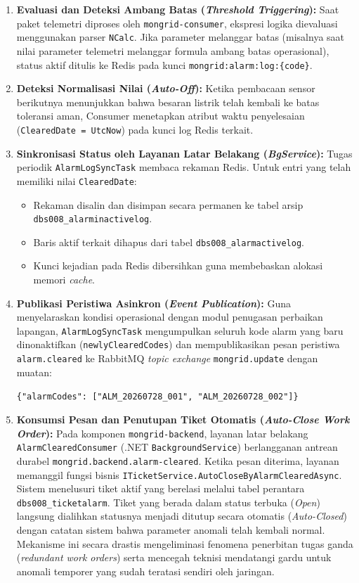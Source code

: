 \begin{enumerate}[label=\arabic*., leftmargin=*, itemsep=0pt]
  \item \textbf{Evaluasi dan Deteksi Ambang Batas (\textit{Threshold Triggering}):} Saat paket telemetri diproses oleh \texttt{mongrid-consumer}, ekspresi logika dievaluasi menggunakan parser \texttt{NCalc}. Jika parameter melanggar batas (misalnya saat nilai parameter telemetri melanggar formula ambang batas operasional), status aktif ditulis ke Redis pada kunci \texttt{mongrid:alarm:log:\{code\}}.
  \item \textbf{Deteksi Normalisasi Nilai (\textit{Auto-Off}):} Ketika pembacaan sensor berikutnya menunjukkan bahwa besaran listrik telah kembali ke batas toleransi aman, Consumer menetapkan atribut waktu penyelesaian (\texttt{ClearedDate = UtcNow}) pada kunci log Redis terkait.
  \item \textbf{Sinkronisasi Status oleh Layanan Latar Belakang (\textit{BgService}):} Tugas periodik \texttt{AlarmLogSyncTask} membaca rekaman Redis. Untuk entri yang telah memiliki nilai \texttt{ClearedDate}:
  \begin{itemize}[leftmargin=*, itemsep=0pt]
    \item Rekaman disalin dan disimpan secara permanen ke tabel arsip \texttt{dbs008\_alarminactivelog}.
    \item Baris aktif terkait dihapus dari tabel \texttt{dbs008\_alarmactivelog}.
    \item Kunci kejadian pada Redis dibersihkan guna membebaskan alokasi memori \textit{cache}.
  \end{itemize}
  \item \textbf{Publikasi Peristiwa Asinkron (\textit{Event Publication}):} Guna menyelaraskan kondisi operasional dengan modul penugasan perbaikan lapangan, \texttt{AlarmLogSyncTask} mengumpulkan seluruh kode alarm yang baru dinonaktifkan (\texttt{newlyClearedCodes}) dan mempublikasikan pesan peristiwa \texttt{alarm.cleared} ke RabbitMQ \textit{topic exchange} \texttt{mongrid.update} dengan muatan:
  \begin{center}
    \texttt{\{"alarmCodes": ["ALM\_20260728\_001", "ALM\_20260728\_002"]\}}
  \end{center}
  \item \textbf{Konsumsi Pesan dan Penutupan Tiket Otomatis (\textit{Auto-Close Work Order}):} Pada komponen \texttt{mongrid-backend}, layanan latar belakang \texttt{AlarmClearedConsumer} (.NET \texttt{BackgroundService}) berlangganan antrean durabel \texttt{mongrid.backend.alarm-cleared}. Ketika pesan diterima, layanan memanggil fungsi bisnis \texttt{ITicketService.AutoCloseByAlarmClearedAsync}. Sistem menelusuri tiket aktif yang berelasi melalui tabel perantara \texttt{dbs008\_ticketalarm}. Tiket yang berada dalam status terbuka (\textit{Open}) langsung dialihkan statusnya menjadi ditutup secara otomatis (\textit{Auto-Closed}) dengan catatan sistem bahwa parameter anomali telah kembali normal. Mekanisme ini secara drastis mengeliminasi fenomena penerbitan tugas ganda (\textit{redundant work orders}) serta mencegah teknisi mendatangi gardu untuk anomali temporer yang sudah teratasi sendiri oleh jaringan.
\end{enumerate}

